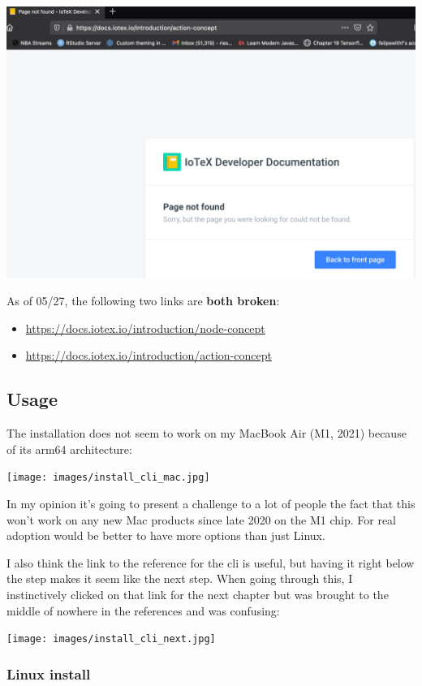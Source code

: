 \documentclass[
]{book}
\begin{document}
\includegraphics[width=7.29167in,height=\textheight]{images/actions_docs_not_found.jpg}

As of 05/27, the following two links are \textbf{both broken}:

\begin{itemize}
\item
  \url{https://docs.iotex.io/introduction/node-concept}
\item
  \url{https://docs.iotex.io/introduction/action-concept}
\end{itemize}

\hypertarget{usage}{%
\subsection{Usage}\label{usage}}

The installation does not seem to work on my MacBook Air (M1, 2021)
because of its arm64 architecture:

\texttt{[image: images/install\_cli\_mac.jpg]}

In my opinion it's going to present a challenge to a lot of people the
fact that this won't work on any new Mac products since late 2020 on the
M1 chip. For real adoption would be better to have more options than
just Linux.

I also think the link to the reference for the cli is useful, but having
it right below the step makes it seem like the next step. When going
through this, I instinctively clicked on that link for the next chapter
but was brought to the middle of nowhere in the references and was
confusing:

\texttt{[image: images/install\_cli\_next.jpg]}

\hypertarget{linux-install}{%
\subsubsection{Linux install}\label{linux-install}}
\end{document}

